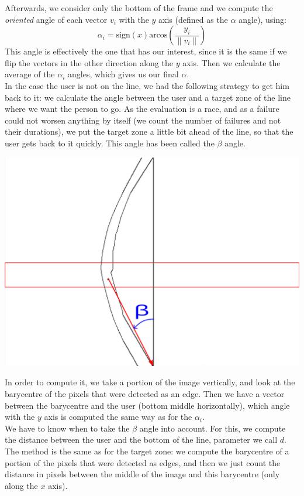 \documentclass{rapport}
\begin{document}
\begin{center}
\end{center}
Afterwards, we consider only the bottom of the frame and we compute the \textit{oriented} angle of each vector \(v_i\) with the \(y\) axis (defined as the \(\alpha\) angle), using:
\[ {\alpha}_i = \text{sign}(x) \text{arcos}\left(\frac{y_i}{\|v_i\|}\right) \]
This angle is effectively the one that has our interest, since it is the same if we flip the vectors in the other direction along the \(y\) axis.
Then we calculate the average of the \(\alpha_i\) angles, which gives us our final \(\alpha\).\\
In the case the user is not on the line, we had the following strategy to get him back to it: we calculate the angle between the user and a target zone of the line where we want the person to go. As the evaluation is a race, and as a failure could not worsen anything by itself (we count the number of failures and not their durations), we put the target zone a little bit ahead of the line, so that the user gets back to it quickly. This angle has been called the \(\beta\) angle.\\
\begin{center}
    \includegraphics[width=0.3\linewidth]{angle_beta_barycentre_targetpoint.png}
\end{center}
In order to compute it, we take a portion of the image vertically, and look at the barycentre of the pixels that were detected as an edge. Then we have a vector between the barycentre and the user (bottom middle horizontally), which angle with the \(y\) axis is computed the same way as for the \(\alpha_i\).\\We have to know when to take the \(\beta\) angle into account. For this, we compute the distance between the user and the bottom of the line, parameter we call \(d\). The method is the same as for the target zone: we compute the barycentre of a portion of the pixels that were detected as edges, and then we just count the distance in pixels between the middle of the image and this barycentre (only along the \(x\) axis).\\
\end{document}
